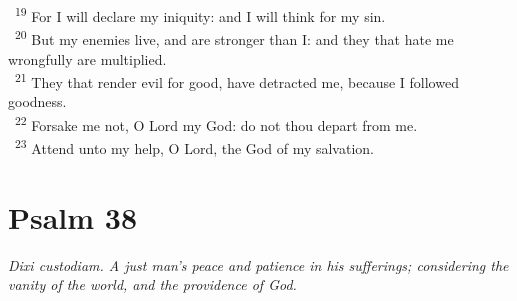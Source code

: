 \documentclass[a5paper,12pt]{article}
\begin{document}
\begin{multicols*}{2}
~\textsuperscript{19} For I will declare my iniquity: and I will think for my sin.\\
~\textsuperscript{20} But my enemies live, and are stronger than I: and they that hate me wrongfully are multiplied.\\
~\textsuperscript{21} They that render evil for good, have detracted me, because I followed goodness.\\
~\textsuperscript{22} Forsake me not, O Lord my God: do not thou depart from me.\\
~\textsuperscript{23} Attend unto my help, O Lord, the God of my salvation.\\

\section{Psalm 38}
\label{sec:org3f33337}
\emph{Dixi custodiam. A just man's peace and patience in his sufferings; considering the vanity of the world, and the providence of God.}\\


\end{multicols*}
\end{document}
